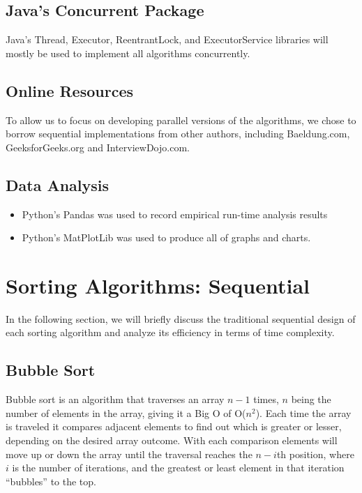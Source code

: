 \documentclass{article}
\begin{document}
\subsection{Java's Concurrent Package}
Java's Thread, Executor, ReentrantLock, and ExecutorService libraries will mostly be used to implement all algorithms concurrently. \cite{javathread, javalibs, javalock, executor} 

\subsection{Online Resources}
To allow us to focus on developing parallel versions of the algorithms, we chose to borrow sequential implementations from other authors, including Baeldung.com, GeeksforGeeks.org and InterviewDojo.com.

\subsection{Data Analysis}
\begin{itemize}
  \item Python's Pandas was used to record empirical run-time analysis results
  \item Python's MatPlotLib was used to produce all of graphs and charts.
\end{itemize}

\section{Sorting Algorithms: Sequential}
In the following section, we will briefly discuss the traditional sequential design of each sorting algorithm and analyze its efficiency in terms of time complexity.

\subsection{Bubble Sort}
Bubble sort is an algorithm that traverses an array $n-1$ times, $n$ being the number of elements in the array, giving it a Big O of O($n^2$). Each time the array is traveled it compares adjacent elements to find out which is greater or lesser, depending on the desired array outcome. With each comparison elements will move up or down the array until the traversal reaches the $n-i$th position, where $i$ is the number of iterations, and the greatest or least element in that iteration “bubbles” to the top.\cite{bubbleSort}
\end{document}
